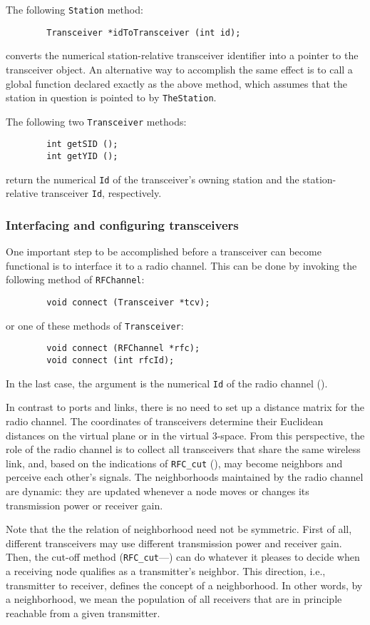 The following {\tt Station} method:
\begin{verbatim}
        Transceiver *idToTransceiver (int id);
\end{verbatim}
converts the numerical station-relative transceiver identifier into
a pointer to the transceiver object.
An alternative way to accomplish the same effect
is to call a global function declared
exactly as the above method, which assumes that the station in question is
pointed to by {\tt TheStation}.

The following two {\tt Transceiver} methods:
\begin{verbatim}
        int getSID ();
        int getYID ();
\end{verbatim}
return the numerical {\tt Id} of the transceiver's owning station and the
station-relative transceiver {\tt Id}, respectively.

\subsubsection{Interfacing and configuring transceivers}
\label{rm_to_tr_if}

One important step to be accomplished before a transceiver can become
functional is to interface it to a radio channel.
This can be done by invoking the following method of {\tt RFChannel}:
\begin{verbatim}
        void connect (Transceiver *tcv);
\end{verbatim}
\noindent
or one of these methods of {\tt Transceiver}:
\begin{verbatim}
        void connect (RFChannel *rfc);
        void connect (int rfcId);
\end{verbatim}
\noindent
In the last case, the argument is the numerical {\tt Id} of the radio channel
().

In contrast to ports and links, there is no need to set up a distance matrix
for the radio channel.
The coordinates of transceivers determine their Euclidean distances on the
virtual plane or in the virtual 3-space.
From this perspective, the role of the radio channel is to collect
all transceivers that share the same wireless link, and, based
on the indications of {\tt RFC\_cut} (), may become
neighbors and perceive each other's signals.
The neighborhoods maintained by the radio channel are dynamic: they are updated
whenever a node moves or changes its transmission power or receiver
gain.

Note that the the relation of neighborhood need not be symmetric.
First of all, different transceivers may use different transmission power
and receiver gain.
Then, the cut-off method ({\tt RFC\_cut}---) can do whatever
it pleases to decide when a receiving node qualifies as a transmitter's
neighbor.
This direction, i.e., transmitter to receiver, defines the concept
of a neighborhood.
In other words, by a neighborhood, we mean the population of all receivers
that are in principle reachable from a given transmitter.

